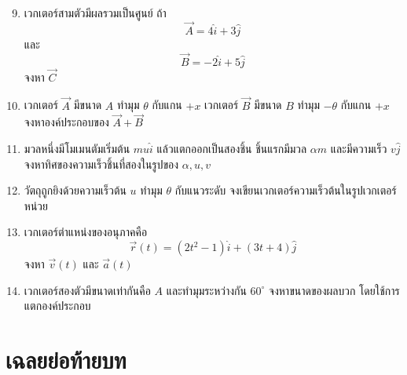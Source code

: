 \documentclass[12pt,a4paper]{report}
\begin{document}
\begin{enumerate}
    \setcounter{enumi}{8}
    \item เวกเตอร์สามตัวมีผลรวมเป็นศูนย์ ถ้า
    \[
    \vec{A}=4\hat{i}+3\hat{j}
    \]
    และ
    \[
    \vec{B}=-2\hat{i}+5\hat{j}
    \]
    จงหา $\vec{C}$
    
    \item เวกเตอร์ $\vec{A}$ มีขนาด $A$ ทำมุม $\theta$ กับแกน $+x$ เวกเตอร์ $\vec{B}$ มีขนาด $B$ ทำมุม $-\theta$ กับแกน $+x$ จงหาองค์ประกอบของ $\vec{A}+\vec{B}$
    
    \item มวลหนึ่งมีโมเมนตัมเริ่มต้น $mu\hat{i}$ แล้วแตกออกเป็นสองชิ้น ชิ้นแรกมีมวล $\alpha m$ และมีความเร็ว $v\hat{j}$ จงหาทิศของความเร็วชิ้นที่สองในรูปของ $\alpha,u,v$
    
    \item วัตถุถูกยิงด้วยความเร็วต้น $u$ ทำมุม $\theta$ กับแนวระดับ จงเขียนเวกเตอร์ความเร็วต้นในรูปเวกเตอร์หน่วย
    
    \item เวกเตอร์ตำแหน่งของอนุภาคคือ
    \[
    \vec{r}(t)=(2t^2-1)\hat{i}+(3t+4)\hat{j}
    \]
    จงหา $\vec{v}(t)$ และ $\vec{a}(t)$
    
    \item เวกเตอร์สองตัวมีขนาดเท่ากันคือ $A$ และทำมุมระหว่างกัน $60^\circ$ จงหาขนาดของผลบวก โดยใช้การแตกองค์ประกอบ
\end{enumerate}

\section{เฉลยย่อท้ายบท}
\end{document}
